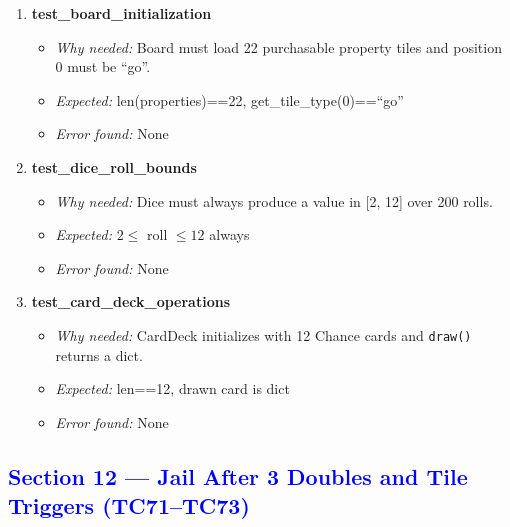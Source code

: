 \documentclass{article}
\begin{document}
\begin{enumerate}[resume, label=\textbf{TC\arabic*.}]

  \item \textbf{test\_board\_initialization}
  \begin{itemize}[noitemsep]
    \item \textit{Why needed:} Board must load 22 purchasable property tiles and position 0 must be ``go''.
    \item \textit{Expected:} len(properties)==22, get\_tile\_type(0)==``go''
    \item \textit{Error found:} None
  \end{itemize}

  \item \textbf{test\_dice\_roll\_bounds}
  \begin{itemize}[noitemsep]
    \item \textit{Why needed:} Dice must always produce a value in [2, 12] over 200 rolls.
    \item \textit{Expected:} $2 \leq$ roll $\leq 12$ always
    \item \textit{Error found:} None
  \end{itemize}

  \item \textbf{test\_card\_deck\_operations}
  \begin{itemize}[noitemsep]
    \item \textit{Why needed:} CardDeck initializes with 12 Chance cards and \texttt{draw()} returns a dict.
    \item \textit{Expected:} len==12, drawn card is dict
    \item \textit{Error found:} None
  \end{itemize}

\end{enumerate}

\subsection*{\textcolor{blue}{Section 12 — Jail After 3 Doubles and Tile Triggers (TC71--TC73)}}
\end{document}
